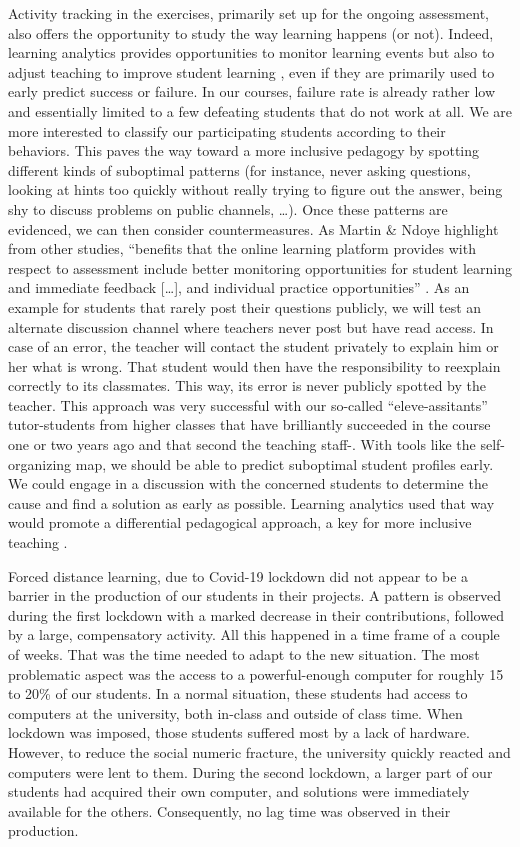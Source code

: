 \documentclass{aims}
\theoremstyle{definition}
\begin{document}
Activity tracking in the exercises, primarily set up for the ongoing
assessment, also offers the opportunity to study the way learning
happens (or not). Indeed, learning analytics provides opportunities to
monitor learning events but also to adjust teaching to improve student
learning \cite{Martin2016, Romero2020}, even if they are primarily used
to early predict success or failure. In our courses, failure rate is
already rather low and essentially limited to a few defeating students
that do not work at all. We are more interested to classify our
participating students according to their behaviors. This paves the way
toward a more inclusive pedagogy by spotting different kinds of
suboptimal patterns (for instance, never asking questions, looking at
hints too quickly without really trying to figure out the answer, being
shy to discuss problems on public channels, \ldots). Once these patterns
are evidenced, we can then consider countermeasures. As Martin \& Ndoye
highlight from other studies, ``benefits that the online learning
platform provides with respect to assessment include better monitoring
opportunities for student learning and immediate feedback {[}\ldots{]},
and individual practice opportunities'' \cite{Martin2016}. As an example
for students that rarely post their questions publicly, we will test an
alternate discussion channel where teachers never post but have read
access. In case of an error, the teacher will contact the student
privately to explain him or her what is wrong. That student would then
have the responsibility to reexplain correctly to its classmates. This
way, its error is never publicly spotted by the teacher. This approach
was very successful with our so-called ``eleve-assitants''
tutor-students from higher classes that have brilliantly succeeded in
the course one or two years ago and that second the teaching staff-.
With tools like the self-organizing map, we should be able to predict
suboptimal student profiles early. We could engage in a discussion with
the concerned students to determine the cause and find a solution as
early as possible. Learning analytics used that way would promote a
differential pedagogical approach, a key for more inclusive teaching
\cite{Siemens2013}.

Forced distance learning, due to Covid-19 lockdown did not appear to be
a barrier in the production of our students in their projects. A pattern
is observed during the first lockdown with a marked decrease in their
contributions, followed by a large, compensatory activity. All this
happened in a time frame of a couple of weeks. That was the time needed
to adapt to the new situation. The most problematic aspect was the
access to a powerful-enough computer for roughly 15 to 20\% of our
students. In a normal situation, these students had access to computers
at the university, both in-class and outside of class time. When
lockdown was imposed, those students suffered most by a lack of
hardware. However, to reduce the social numeric fracture, the university
quickly reacted and computers were lent to them. During the second
lockdown, a larger part of our students had acquired their own computer,
and solutions were immediately available for the others. Consequently,
no lag time was observed in their production.
\end{document}
